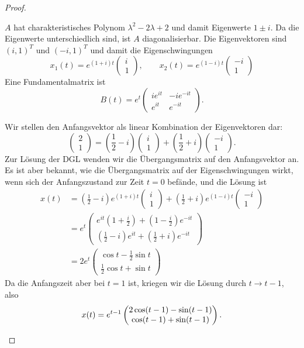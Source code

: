 \begin{proof}
	\begin{parts}
		\item $A$ hat charakteristisches Polynom $\lambda^2-2\lambda+2$ und damit Eigenwerte $1\pm i$. Da die Eigenwerte unterschiedlich sind, ist $A$ diagonalisierbar. Die Eigenvektoren sind $(i, 1)^T$ und $(-i, 1)^T$ und damit die Eigenschwingungen
		\[x_1(t) = e^{(1+i)t}\begin{pmatrix}i \\ 1\end{pmatrix},\qquad x_2(t)=e^{(1-i)t}\begin{pmatrix}-i \\ 1 \end{pmatrix}\]
		Eine Fundamentalmatrix ist
		\[B(t) = e^t\begin{pmatrix}
			ie^{it} & -ie^{-it}\\
			e^{it} & e^{-it}
		\end{pmatrix}.\]
	\item Wir stellen den Anfangsvektor als linear Kombination der Eigenvektoren dar:
	\[\begin{pmatrix}
		2 \\ 1
	\end{pmatrix}=\left(\frac 12 - i\right)\begin{pmatrix}
	i \\ 1
\end{pmatrix}+ \left(\frac 12 + i\right)\begin{pmatrix}
-i \\ 1
\end{pmatrix}.\]
Zur Lösung der DGL wenden wir die Übergangsmatrix auf den Anfangsvektor an. Es ist aber bekannt, wie die Übergangsmatrix auf der Eigenschwingungen wirkt, wenn sich der Anfangszustand zur Zeit $t=0$ befände, und die Lösung ist
\begin{align*}
	x(t)&=\left(\frac 12 - i\right)e^{(1+i)t}\begin{pmatrix}
		i \\ 1
	\end{pmatrix}+ \left(\frac 12 + i\right)e^{(1-i)t}\begin{pmatrix}
		-i \\ 1
	\end{pmatrix}\\
&=e^t\begin{pmatrix}
	e^{it}\left(1 +\frac i2\right)+\left(1 - \frac i2\right)e^{-i t}\\
	\left(\frac 12 - i\right)e^{it} + \left(\frac 12 + i\right)e^{-it}
\end{pmatrix}\\
&= 2e^t\begin{pmatrix}
	\cos t -\frac 12 \sin t\\
	\frac 12 \cos t + \sin t
\end{pmatrix}
\end{align*}
Da die Anfangszeit aber bei $t=1$ ist, kriegen wir die L\"{o}sung durch $t\to t-1$, also
\[x(t) = e^{t-1}\begin{pmatrix}
	2\cos(t-1) -\sin (t-1)\\
	\cos (t-1)+\sin (t-1)
\end{pmatrix}.\qedhere\]
	\end{parts}
\end{proof}
